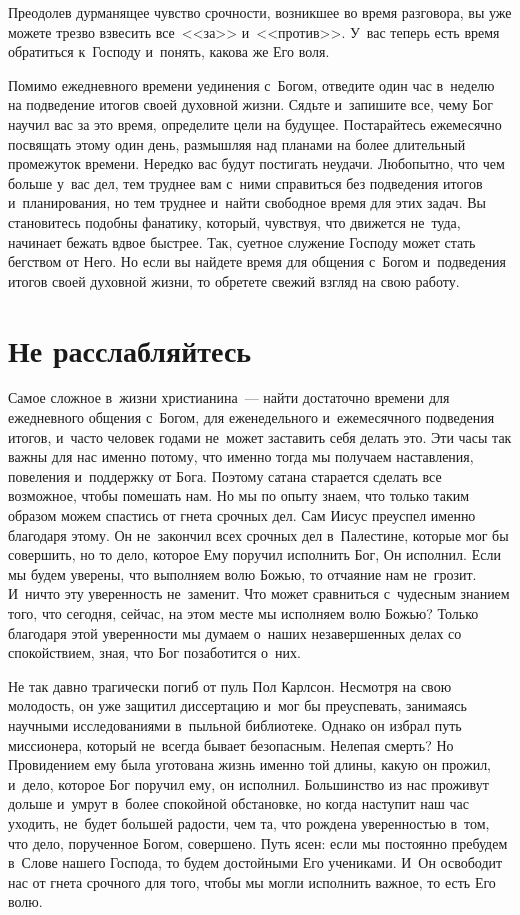 \documentclass[12pt,article,a4paper,fittopage]{ncc}
\begin{document}
\begin{multicols}{2}
Преодолев дурманящее чувство срочности, возникшее во время разговора, вы уже можете трезво взвесить все\ <<за>> и\ <<против>>. У~вас теперь есть время обратиться к~Господу и~понять, какова же Его воля.

Помимо ежедневного времени уединения с~Богом, отведите один час в~неделю на подведение итогов своей духовной жизни. Сядьте и~запишите все, чему Бог научил вас за это время, определите цели на будущее. Постарайтесь ежемесячно посвящать этому один день, размышляя над планами на более длительный промежуток времени. Нередко вас будут постигать неудачи. Любопытно, что чем больше у~вас дел, тем труднее вам с~ними справиться без подведения итогов и~планирования, но тем труднее и~найти свободное время для этих задач. Вы становитесь подобны фанатику, который, чувствуя, что движется не~туда, начинает бежать вдвое быстрее. Так, суетное служение Господу может стать бегством от Него. Но если вы найдете время для общения с~Богом и~подведения итогов своей духовной жизни, то обретете свежий взгляд на свою работу.

\section*{Не расслабляйтесь}

Самое сложное в~жизни христианина~--- найти достаточно времени для ежедневного общения с~Богом, для еженедельного и~ежемесячного подведения итогов, и~часто человек годами не~может заставить себя делать это. Эти часы так важны для нас именно потому, что именно тогда мы получаем наставления, повеления и~поддержку от Бога. Поэтому сатана старается сделать все возможное, чтобы помешать нам. Но мы по опыту знаем, что только таким образом можем спастись от гнета срочных дел. Сам Иисус преуспел именно благодаря этому. Он не~закончил всех срочных дел в~Палестине, которые мог бы совершить, но то дело, которое Ему поручил исполнить Бог, Он исполнил. Если мы будем уверены, что выполняем волю Божью, то отчаяние нам не~грозит. И~ничто эту уверенность не~заменит. Что может сравниться с~чудесным знанием того, что сегодня, сейчас, на этом месте мы исполняем волю Божью? Только благодаря этой уверенности мы думаем о~наших незавершенных делах со спокойствием, зная, что Бог позаботится о~них.

Не так давно трагически погиб от пуль Пол Карлсон. Несмотря на свою молодость, он уже защитил диссертацию и~мог бы преуспевать, занимаясь научными исследованиями в~пыльной библиотеке. Однако он избрал путь миссионера, который не~всегда бывает безопасным. Нелепая смерть? Но Провидением ему была уготована жизнь именно той длины, какую он прожил, и~дело, которое Бог поручил ему, он исполнил. Большинство из нас проживут дольше и~умрут в~более спокойной обстановке, но когда наступит наш час уходить, не~будет большей радости, чем та, что рождена уверенностью в~том, что дело, порученное Богом, совершено. Путь ясен: если мы постоянно пребудем в~Слове нашего Господа, то будем достойными Его учениками. И~Он освободит нас от гнета срочного для того, чтобы мы могли исполнить важное, то есть Его волю.

\thispagestyle{lheadings}

\end{multicols}
\end{document}
